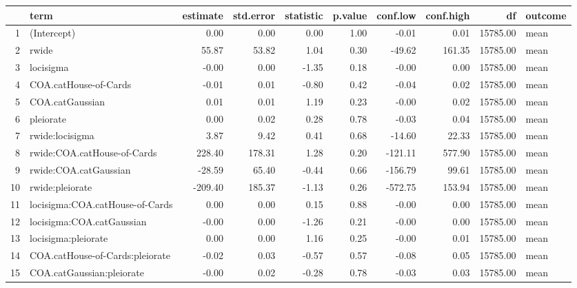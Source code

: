 \begin{table}[ht]
\centering
\begin{tabular}{rlrrrrrrrl}
  \hline
 & term & estimate & std.error & statistic & p.value & conf.low & conf.high & df & outcome \\ 
  \hline
1 & (Intercept) & 0.00 & 0.00 & 0.00 & 1.00 & -0.01 & 0.01 & 15785.00 & mean \\ 
  2 & rwide & 55.87 & 53.82 & 1.04 & 0.30 & -49.62 & 161.35 & 15785.00 & mean \\ 
  3 & locisigma & -0.00 & 0.00 & -1.35 & 0.18 & -0.00 & 0.00 & 15785.00 & mean \\ 
  4 & COA.catHouse-of-Cards & -0.01 & 0.01 & -0.80 & 0.42 & -0.04 & 0.02 & 15785.00 & mean \\ 
  5 & COA.catGaussian & 0.01 & 0.01 & 1.19 & 0.23 & -0.00 & 0.02 & 15785.00 & mean \\ 
  6 & pleiorate & 0.00 & 0.02 & 0.28 & 0.78 & -0.03 & 0.04 & 15785.00 & mean \\ 
  7 & rwide:locisigma & 3.87 & 9.42 & 0.41 & 0.68 & -14.60 & 22.33 & 15785.00 & mean \\ 
  8 & rwide:COA.catHouse-of-Cards & 228.40 & 178.31 & 1.28 & 0.20 & -121.11 & 577.90 & 15785.00 & mean \\ 
  9 & rwide:COA.catGaussian & -28.59 & 65.40 & -0.44 & 0.66 & -156.79 & 99.61 & 15785.00 & mean \\ 
  10 & rwide:pleiorate & -209.40 & 185.37 & -1.13 & 0.26 & -572.75 & 153.94 & 15785.00 & mean \\ 
  11 & locisigma:COA.catHouse-of-Cards & 0.00 & 0.00 & 0.15 & 0.88 & -0.00 & 0.00 & 15785.00 & mean \\ 
  12 & locisigma:COA.catGaussian & -0.00 & 0.00 & -1.26 & 0.21 & -0.00 & 0.00 & 15785.00 & mean \\ 
  13 & locisigma:pleiorate & 0.00 & 0.00 & 1.16 & 0.25 & -0.00 & 0.01 & 15785.00 & mean \\ 
  14 & COA.catHouse-of-Cards:pleiorate & -0.02 & 0.03 & -0.57 & 0.57 & -0.08 & 0.05 & 15785.00 & mean \\ 
  15 & COA.catGaussian:pleiorate & -0.00 & 0.02 & -0.28 & 0.78 & -0.03 & 0.03 & 15785.00 & mean \\ 
   \hline
\end{tabular}
\end{table}

